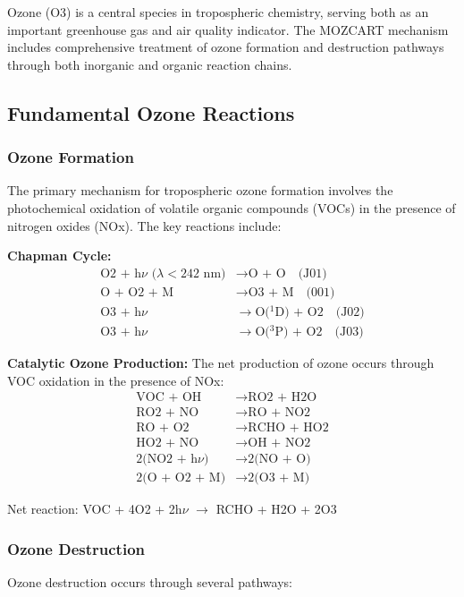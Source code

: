 \documentclass[12pt,a4paper]{article}
\begin{document}
Ozone (O3) is a central species in tropospheric chemistry, serving both as an important greenhouse gas and air quality indicator. The MOZCART mechanism includes comprehensive treatment of ozone formation and destruction pathways through both inorganic and organic reaction chains.

\subsection{Fundamental Ozone Reactions}

\subsubsection{Ozone Formation}
The primary mechanism for tropospheric ozone formation involves the photochemical oxidation of volatile organic compounds (VOCs) in the presence of nitrogen oxides (NOx). The key reactions include:

\textbf{Chapman Cycle:}
\begin{align}
\text{O2 + h$\nu$ ($\lambda < 242$ nm)} &\rightarrow \text{O + O} \quad \text{(J01)} \\
\text{O + O2 + M} &\rightarrow \text{O3 + M} \quad \text{(001)} \\
\text{O3 + h$\nu$} &\rightarrow \text{O($^1$D) + O2} \quad \text{(J02)} \\
\text{O3 + h$\nu$} &\rightarrow \text{O($^3$P) + O2} \quad \text{(J03)}
\end{align}

\textbf{Catalytic Ozone Production:}
The net production of ozone occurs through VOC oxidation in the presence of NOx:
\begin{align}
\text{VOC + OH} &\rightarrow \text{RO2 + H2O} \\
\text{RO2 + NO} &\rightarrow \text{RO + NO2} \\
\text{RO + O2} &\rightarrow \text{RCHO + HO2} \\
\text{HO2 + NO} &\rightarrow \text{OH + NO2} \\
\text{2(NO2 + h$\nu$)} &\rightarrow \text{2(NO + O)} \\
\text{2(O + O2 + M)} &\rightarrow \text{2(O3 + M)}
\end{align}

Net reaction: VOC + 4O2 + 2h$\nu$ $\rightarrow$ RCHO + H2O + 2O3

\subsubsection{Ozone Destruction}
Ozone destruction occurs through several pathways:
\end{document}
